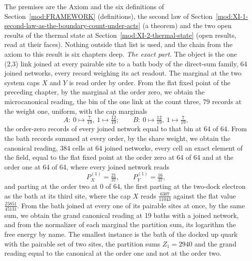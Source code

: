 \begin{chproof}
The premises are the Axiom and the six definitions of Section~\ref{mod:FRAMEWORK} (definitions), the second law of Section~\ref{mod:XI-1-second-law-as-the-boundary-count-under-acts} (a theorem) and the two open results of the thermal state at Section~\ref{mod:XI-2-thermal-state} (open results, read at their faces). Nothing outside that list is used, and the chain from the axiom to this result is six chapters deep.
\emph{The exact part.} The object is the one (2,3) link joined at every pairable site to a bath body of the direct-sum family, 64 joined networks, every record weighing its act readout. The marginal at the two system caps $X$ and $Y$ is read order by order. From the flat fixed point of the preceding chapter, by the marginal at the order zero, we obtain the microcanonical reading, the bin of the one link at the count three, 79 records at the weight one, uniform, with the cap marginals
\begin{equation}
A: \ 0 \mapsto \tfrac{7}{19}, \ 1 \mapsto \tfrac{12}{19}; \qquad B: \ 0 \mapsto \tfrac{12}{19}, \ 1 \mapsto \tfrac{7}{19},
\end{equation}
the order-zero records of every joined network equal to that bin at 64 of 64. From the bath records summed at every order, by the share weight, we obtain the canonical reading, 384 cells at 64 joined networks, every cell an exact element of the field, equal to the flat fixed point at the order zero at 64 of 64 and at the order one at 64 of 64, where every joined network reads
\begin{equation}
P^{(1)}_{X} = \tfrac{21}{37}, \qquad P^{(1)}_{Y} = \tfrac{16}{37},
\end{equation}
and parting at the order two at 0 of 64, the first parting at the two-dock electron as the bath at its third site, where the cap $X$ reads $\tfrac{6307}{11043}$ against the flat value $\tfrac{25851}{45131}$. From the bath joined at every one of its pairable sites at once, by the same sum, we obtain the grand canonical reading at 19 baths with a joined network, and from the normalizer of each marginal the partition sum, its logarithm the free energy by name. The smallest instance is the bath of the docked up quark with the pairable set of two sites, the partition sums $Z_{1} = 2940$ and the grand reading equal to the canonical at the order one and not at the order two.

\end{chproof}
